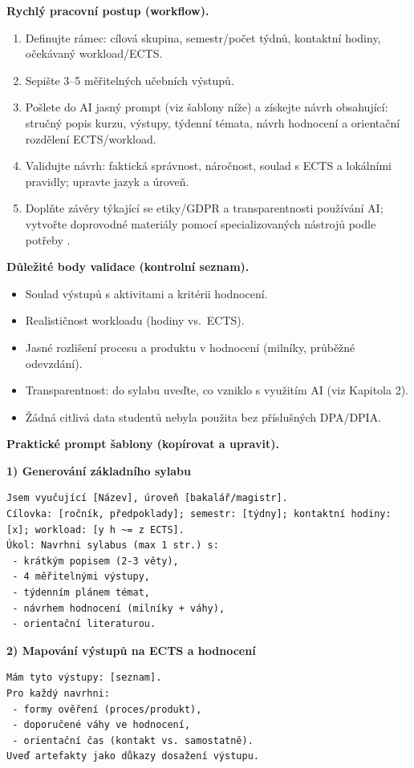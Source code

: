 \documentclass{report}%
\begin{document}
\medskip
\textbf{Rychlý pracovní postup (workflow).}
\begin{enumerate}
  \item Definujte rámec: cílová skupina, semestr/počet týdnů, kontaktní hodiny, očekávaný workload/ECTS.
  \item Sepište 3--5 měřitelných učebních výstupů.
  \item Pošlete do AI jasný prompt (viz šablony níže) a získejte návrh obsahující: stručný popis kurzu, výstupy, týdenní témata, návrh hodnocení a orientační rozdělení ECTS/workload.
  \item Validujte návrh: faktická správnost, náročnost, soulad s ECTS a lokálními pravidly; upravte jazyk a úroveň.
  \item Doplňte závěry týkající se etiky/GDPR a transparentnosti používání AI; vytvořte doprovodné materiály pomocí specializovaných nástrojů podle potřeby \cite{kb_ai_101_tipu_pdf_04e4a115_page_44_2, kb_ai_101_tipu_pdf_04e4a115_page_51_1}.
\end{enumerate}

\medskip
\textbf{Důležité body validace (kontrolní seznam).}
\begin{itemize}
  \item Soulad výstupů s aktivitami a kritérii hodnocení.
  \item Realističnost workloadu (hodiny vs.\ ECTS).
  \item Jasné rozlišení procesu a produktu v hodnocení (milníky, průběžné odevzdání).
  \item Transparentnost: do sylabu uveďte, co vzniklo s využitím AI (viz Kapitola 2).
  \item Žádná citlivá data studentů nebyla použita bez příslušných DPA/DPIA.
\end{itemize}

\medskip
\textbf{Praktické prompt šablony (kopírovat a upravit).}

\textbf{1) Generování základního sylabu}
\begin{verbatim}
Jsem vyučující [Název], úroveň [bakalář/magistr].
Cílovka: [ročník, předpoklady]; semestr: [týdny]; kontaktní hodiny: [x]; workload: [y h ~= z ECTS].
Úkol: Navrhni sylabus (max 1 str.) s:
 - krátkým popisem (2-3 věty),
 - 4 měřitelnými výstupy,
 - týdenním plánem témat,
 - návrhem hodnocení (milníky + váhy),
 - orientační literaturou.
\end{verbatim}

\textbf{2) Mapování výstupů na ECTS a hodnocení}
\begin{verbatim}
Mám tyto výstupy: [seznam].
Pro každý navrhni:
 - formy ověření (proces/produkt),
 - doporučené váhy ve hodnocení,
 - orientační čas (kontakt vs. samostatně).
Uveď artefakty jako důkazy dosažení výstupu.
\end{verbatim}
\end{document}
